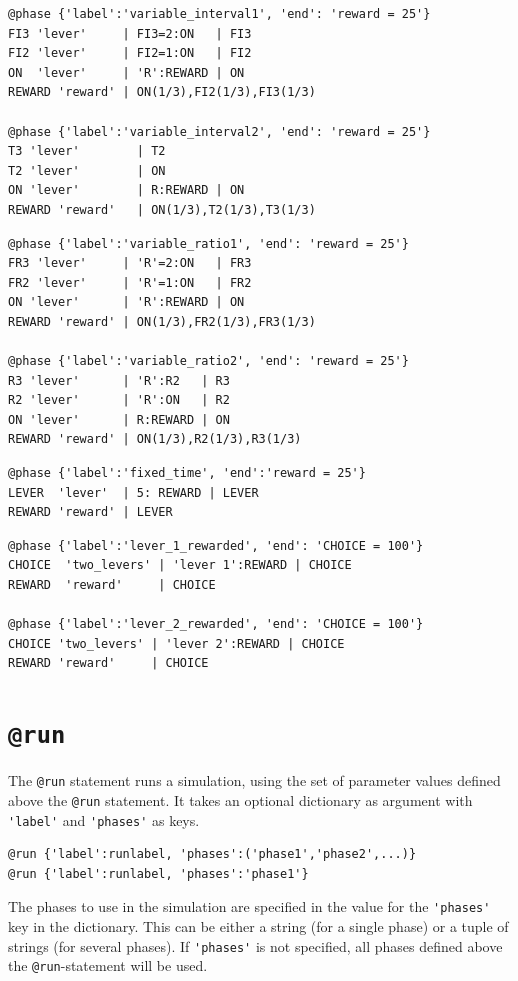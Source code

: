 \documentclass[11pt]{article}
\begin{document}
\begin{lstlisting}[caption={Two equivalent \texttt{@phase} sections for variable interval}, label=lst:phase_example5]
@phase {'label':'variable_interval1', 'end': 'reward = 25'}
FI3	'lever'     | FI3=2:ON   | FI3
FI2	'lever'     | FI2=1:ON   | FI2
ON	'lever'     | 'R':REWARD | ON
REWARD 'reward' | ON(1/3),FI2(1/3),FI3(1/3)  

@phase {'label':'variable_interval2', 'end': 'reward = 25'}
T3 'lever'        | T2
T2 'lever'        | ON
ON 'lever'        | R:REWARD | ON
REWARD 'reward'   | ON(1/3),T2(1/3),T3(1/3)  
\end{lstlisting}

\begin{lstlisting}[caption={Two equivalent \texttt{@phase} sections for variable ratio}, label=lst:phase_example6]
@phase {'label':'variable_ratio1', 'end': 'reward = 25'}
FR3 'lever'     | 'R'=2:ON   | FR3
FR2 'lever'     | 'R'=1:ON   | FR2
ON 'lever'      | 'R':REWARD | ON
REWARD 'reward' | ON(1/3),FR2(1/3),FR3(1/3) 

@phase {'label':'variable_ratio2', 'end': 'reward = 25'}
R3 'lever'      | 'R':R2   | R3
R2 'lever'      | 'R':ON   | R2
ON 'lever'      | R:REWARD | ON
REWARD 'reward' | ON(1/3),R2(1/3),R3(1/3)  
\end{lstlisting}

\begin{lstlisting}[caption={A \texttt{@phase} section for reward after a fixed time}, label=lst:phase_example7]
@phase {'label':'fixed_time', 'end':'reward = 25'}
LEVER  'lever'  | 5: REWARD | LEVER
REWARD 'reward' | LEVER
\end{lstlisting}

\begin{lstlisting}[caption={A \texttt{@phase} section for reversal learning}, label=lst:phase_example8]
@phase {'label':'lever_1_rewarded', 'end': 'CHOICE = 100'}
CHOICE	'two_levers' | 'lever 1':REWARD | CHOICE
REWARD	'reward'     | CHOICE

@phase {'label':'lever_2_rewarded', 'end': 'CHOICE = 100'}
CHOICE 'two_levers' | 'lever 2':REWARD | CHOICE	
REWARD 'reward'     | CHOICE
\end{lstlisting}


\section{\texttt{@run}}
\label{sec:run}
The \verb|@run| statement runs a simulation, using the set of parameter values defined above the \verb|@run| statement. It takes an optional dictionary as argument with \verb|'label'| and \verb|'phases'| as keys.
\begin{lstlisting}[caption={Syntax for \texttt{@run}}, label={run_syntax}]
@run {'label':runlabel, 'phases':('phase1','phase2',...)}
@run {'label':runlabel, 'phases':'phase1'}
\end{lstlisting}
The phases to use in the simulation are specified in the value for the \verb|'phases'| key in the dictionary. This can be either a string (for a single phase) or a tuple of strings (for several phases). If \verb|'phases'| is not specified, all phases defined above the \verb|@run|-statement will be used.
\end{document}
